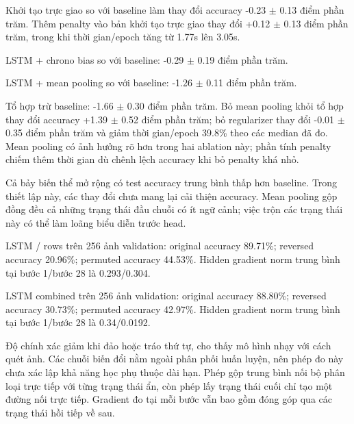 Khởi tạo trực giao so với baseline làm thay đổi accuracy -0.23 $\pm$ 0.13 điểm phần trăm. Thêm penalty vào bản khởi tạo trực giao thay đổi +0.12 $\pm$ 0.13 điểm phần trăm, trong khi thời gian/epoch tăng từ 1.77s lên 3.05s.

LSTM + chrono bias so với baseline: -0.29 $\pm$ 0.19 điểm phần trăm.

LSTM + mean pooling so với baseline: -1.26 $\pm$ 0.11 điểm phần trăm.

Tổ hợp trừ baseline: -1.66 $\pm$ 0.30 điểm phần trăm. Bỏ mean pooling khỏi tổ hợp thay đổi accuracy +1.39 $\pm$ 0.52 điểm phần trăm; bỏ regularizer thay đổi -0.01 $\pm$ 0.35 điểm phần trăm và giảm thời gian/epoch 39.8\% theo các median đã đo. Mean pooling có ảnh hưởng rõ hơn trong hai ablation này; phần tính penalty chiếm thêm thời gian dù chênh lệch accuracy khi bỏ penalty khá nhỏ.

Cả bảy biến thể mở rộng có test accuracy trung bình thấp hơn baseline. Trong thiết lập này, các thay đổi chưa mang lại cải thiện accuracy. Mean pooling gộp đồng đều cả những trạng thái đầu chuỗi có ít ngữ cảnh; việc trộn các trạng thái này có thể làm loãng biểu diễn trước head.

LSTM / rows trên 256 ảnh validation: original accuracy 89.71\%; reversed accuracy 20.96\%; permuted accuracy 44.53\%. Hidden gradient norm trung bình tại bước 1/bước 28 là 0.293/0.304.

LSTM combined trên 256 ảnh validation: original accuracy 88.80\%; reversed accuracy 30.73\%; permuted accuracy 42.97\%. Hidden gradient norm trung bình tại bước 1/bước 28 là 0.34/0.0192.

Độ chính xác giảm khi đảo hoặc tráo thứ tự, cho thấy mô hình nhạy với cách quét ảnh. Các chuỗi biến đổi nằm ngoài phân phối huấn luyện, nên phép đo này chưa xác lập khả năng học phụ thuộc dài hạn. Phép gộp trung bình nối bộ phân loại trực tiếp với từng trạng thái ẩn, còn phép lấy trạng thái cuối chỉ tạo một đường nối trực tiếp. Gradient đo tại mỗi bước vẫn bao gồm đóng góp qua các trạng thái hồi tiếp về sau.
